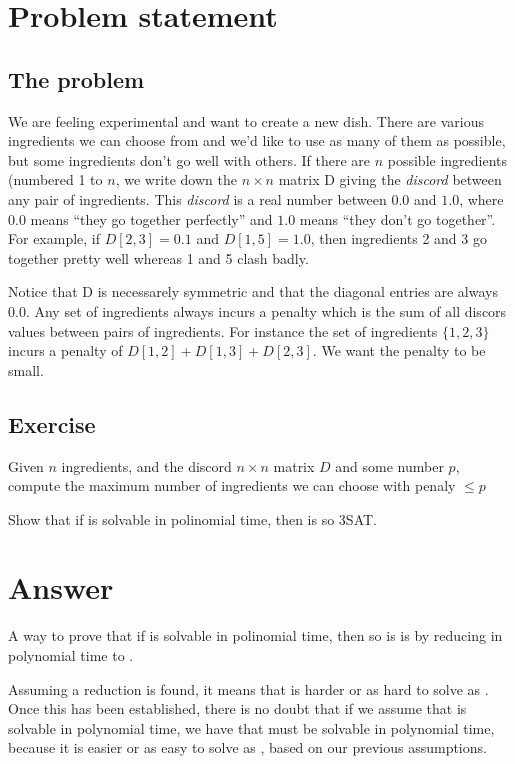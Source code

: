 \section*{Problem statement}
\subsection*{The \exc{} problem}
We are feeling experimental and want to create a new dish. There are various ingredients we can choose from and we'd like to use as many of them as possible, but some ingredients don't go well with others. If there are $n$ possible ingredients (numbered 1 to $n$, we write down the $n\times n$ matrix D giving the \textit{discord} between any pair of ingredients. This \textit{discord} is a real number between $0.0$ and $1.0$, where $0.0$ means ``they go together perfectly'' and $1.0$ means ``they don't go together''. For example, if $D[2,3] = 0.1$ and $D[1,5] = 1.0$, then ingredients 2 and 3 go together pretty well whereas 1  and 5 clash badly.

Notice that D is necessarely symmetric and that the diagonal entries are always $0.0$. Any set of ingredients always incurs a penalty which is the sum of all discors values between pairs of ingredients. For instance the set of ingredients $\{1,2,3\}$ incurs a penalty of $D[1,2] + D[1,3] + D[2,3]$. We want the penalty to be small.

\subsection*{Exercise}
Given $n$ ingredients, and the discord $n \times n$ matrix $D$ and some number $p$, compute the maximum number of ingredients we can choose with penaly $\leq p$

Show that if \exc{} is solvable in polinomial time, then is so 3SAT.

\section*{Answer}
A way to prove that if \exc{} is solvable in polinomial time, then so is \tsat{} is by reducing in polynomial time \tsat{} to \exc{}.

Assuming a reduction is found, it means that \exc{} is harder or as hard to solve as \tsat{}. Once this has been established, there is no doubt that if we assume that \exc{} is solvable in polynomial time, we have that \tsat{} must be solvable in polynomial time, because it is easier or as easy to solve as \exc{}, based on our previous assumptions.

